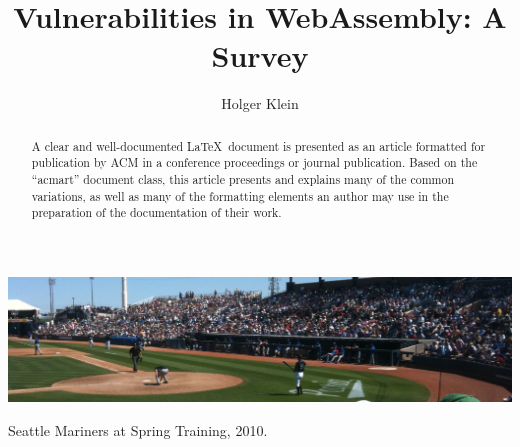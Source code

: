 \documentclass[sigconf]{acmart}
\begin{document}
\title{Vulnerabilities in WebAssembly: A Survey}

\author{Holger Klein}


\renewcommand{\shortauthors}{Holger Klein}

\begin{abstract}
  A clear and well-documented \LaTeX\ document is presented as an
  article formatted for publication by ACM in a conference proceedings
  or journal publication. Based on the ``acmart'' document class, this
  article presents and explains many of the common variations, as well
  as many of the formatting elements an author may use in the
  preparation of the documentation of their work.
\end{abstract}



\begin{teaserfigure}
  \includegraphics[width=\textwidth]{sampleteaser}
  \caption{Seattle Mariners at Spring Training, 2010.}
  \label{fig:teaser}
\end{teaserfigure}
\end{document}
